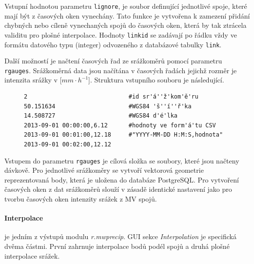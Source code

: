 \documentclass[a4paper,12pt,oneside]{report}
\begin{document}
Vstupní hodnotou parametru \texttt{lignore}, je soubor definující
jednotlivé spoje, které mají být z časových oken vynechány. Tato
funkce je vytvořena k zamezení přidání chybných nebo cíleně
vynechaných spojů do časových oken, která by tak ztrácela validitu pro
plošné interpolace. Hodnoty \texttt{linkid} se zadávají po řádku vždy
ve formátu datového typu (integer) odvozeného z databázové tabulky
\texttt{link}.

Další možností je načtení časových řad ze srážkoměrů pomocí parametru
\texttt{rgauges}. Srážkoměrná data jsou načítána v časových řadách jejichž rozměr je intenzita srážky v [$mm \cdot h^{-1}$]. Struktura vstupního
souboru je následující.


\begin{figure}[h!]
\begin{footnotesize}
\lstset{extendedchars=false,
escapeinside=''}
\begin{lstlisting}[style=mybash]
2                             #id sr'á''ž'kom'ě'ru			
50.151634                     #WGS84 'š''í''ř'ka				
14.508727                     #WGS84 d'é'lka	
2013-09-01 00:00:00,6.12      #hodnoty ve form'á'tu CSV 
2013-09-01 00:01:00,12.18     #"YYYY-MM-DD H:M:S,hodnota"		
2013-09-01 00:02:00,12.12
\end{lstlisting}
\end{footnotesize}
\end{figure}


Vstupem do parametru \texttt{rgauges} je cílová složka se soubory,
které jsou načteny dávkově. Pro jednotlivé srážkoměry se vytvoří
vektorová geometrie reprezentovaná body, která je uložena do databáze
PostgreSQL. Pro vytvoření časových oken z dat srážkoměrů slouží 
v zásadě identické nastavení jako pro tvorbu časových oken 
intenzity srážek z MV spojů.


\paragraph*{Interpolace} je jedním z výstupů modulu
\textit{r.mwprecip}. GUI sekce \textit{Interpolation} je specifická
dvěma částmi. První zahrnuje interpolace bodů podél spojů a druhá
plošné interpolace srážek.
\end{document}
